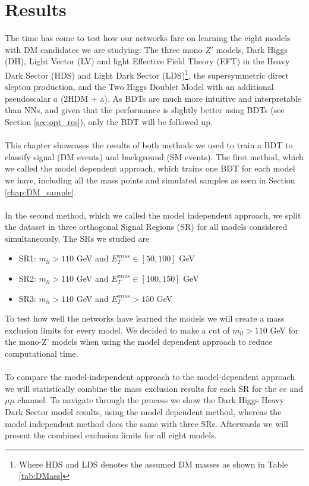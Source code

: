 \documentclass[12pt, a4paper]{book}
\begin{document}
\chapter{Results}\label{chap:results}
The time has come to test how our networks fare on learning the eight models with DM candidates we are studying: The three mono-$Z'$ models, Dark Higgs (DH), Light Vector (LV) and light Effective Field Theory (EFT) in the Heavy Dark Sector (HDS) and Light Dark Sector (LDS)\footnote{Where HDS and LDS denotes the assumed DM masses as shown in Table \ref{tab:DMass}}, 
the supersymmetric direct slepton production, and the Two Higgs Doublet Model with an additional pseudoscalar $a$ (2HDM + a). As BDTs are much more intuitive and interpretable than NNs, and given that the performance is slightly better using BDTs (see Section \ref{sec:opt_res}), only the BDT will be followed up. \\
\\This chapter showcases the results of both methods we used to train a BDT to classify signal (DM events) and background (SM events). The first method, which we called the model dependent approach, which trains one BDT for each model we have, including all the mass points and simulated samples as seen in Section \ref{chap:DM_sample}. \\
\\In the second method, which we called the model independent approach, we split the dataset in three orthogonal Signal Regions (SR) for all models considered simultaneously. The SRs we studied are
\begin{itemize}
   \item SR1: $m_{ll} >110$ GeV and $E_T^{miss} \in [50, 100]$ GeV
   \item SR2: $m_{ll} >110$ GeV and $E_T^{miss} \in [100, 150]$ GeV
   \item SR3: $m_{ll} >110$ GeV and $E_T^{miss} >150$ GeV
\end{itemize}
To test how well the networks have learned the models we will create a mass exclusion limits for every model. We decided to make a cut of $m_{ll} >110$ GeV for the mono-Z' models when using the model dependent approach to reduce computational time.\\
\\To compare the model-independent approach to the model-dependent approach we will statistically combine the mass exclusion results for each SR for the $ee$ and $\mu\mu$ channel. To navigate through the process we show the Dark Higgs Heavy Dark Sector model results, using the model dependent method, 
whereas the model independent method does the same with three SRs. Afterwards we will present the combined exclusion limits for all eight models.
\end{document}
